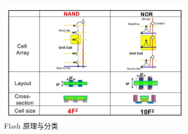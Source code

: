 \begin{figure}[htbp]
  \centering
  \includegraphics[width=0.85\textwidth]{fig/flash-nand-nor.jpg}
  \caption{Flash 原理与分类}
  \label{flash-nand-nor}
\end{figure}

\subsubsection{}

